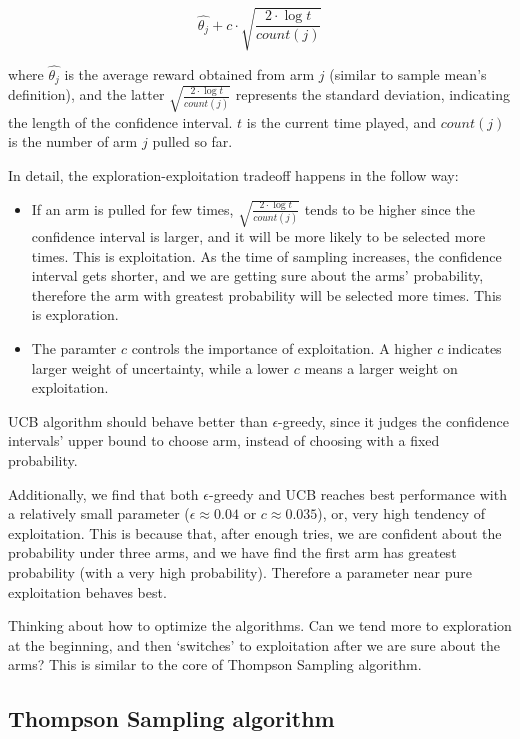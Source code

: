\documentclass[11pt]{article}
\begin{document}
\[
    \hat{\theta_j} + c\cdot \sqrt{\frac{2\cdot \log t}{count(j)}}
\]

where \(\hat{\theta_j}\) is the average reward obtained from arm \(j\)
(similar to sample mean's definition), and the latter
\(\sqrt{\frac{2\cdot \log t}{count(j)}}\) represents the standard
deviation, indicating the length of the confidence interval. \(t\) is
the current time played, and \(count(j)\) is the number of arm \(j\)
pulled so far.

In detail, the exploration-exploitation tradeoff happens in the follow
way:

\begin{itemize}
\item
  If an arm is pulled for few times,
  \(\sqrt{\frac{2\cdot \log t}{count(j)}}\) tends to be higher since the
  confidence interval is larger, and it will be more likely to be
  selected more times. This is exploitation. As the time of sampling
  increases, the confidence interval gets shorter, and we are getting
  sure about the arms' probability, therefore the arm with greatest
  probability will be selected more times. This is exploration.
\item
  The paramter \(c\) controls the importance of exploitation. A higher
  \(c\) indicates larger weight of uncertainty, while a lower \(c\)
  means a larger weight on exploitation.
\end{itemize}

UCB algorithm should behave better than \(\epsilon\)-greedy, since it
judges the confidence intervals' upper bound to choose arm, instead of
choosing with a fixed probability.

    Additionally, we find that both \(\epsilon\)-greedy and UCB reaches best
performance with a relatively small parameter (\(\epsilon\approx 0.04\)
or \(c\approx 0.035\)), or, very high tendency of exploitation. This is
because that, after enough tries, we are confident about the probability
under three arms, and we have find the first arm has greatest
probability (with a very high probability). Therefore a parameter near
pure exploitation behaves best.

Thinking about how to optimize the algorithms. Can we tend more to
exploration at the beginning, and then `switches' to exploitation after
we are sure about the arms? This is similar to the core of Thompson
Sampling algorithm.
\pagebreak
    \hypertarget{thompson-sampling-algorithm}{%
\subsection{Thompson Sampling
algorithm}\label{thompson-sampling-algorithm}}
\end{document}
